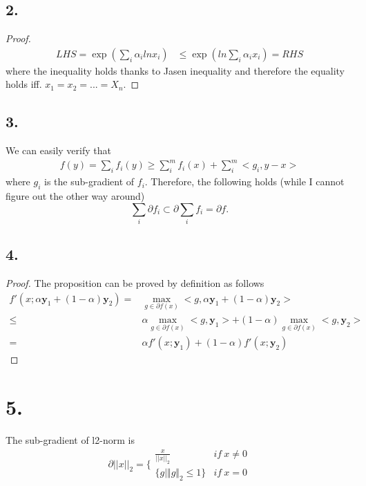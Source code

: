 \documentclass{article}
\begin{document}
\subsection{2.}
\begin{proof}
\begin{align*}
LHS = \exp(\sum_i \alpha_i ln x_i) &\leq \exp( ln \sum_i \alpha_i x_i) = RHS
\end{align*}
where the inequality holds thanks to Jasen inequality and therefore the equality holds iff. $x_1 = x_2= ...= X_n$.
\end{proof}
\subsection{3.}
We can easily verify that
\begin{align*}
f(y) = \sum_i f_i(y) \ge \sum_i^m f_i(x) + \sum_i^m<g_i, y-x> 
\end{align*}
where $g_i$ is the sub-gradient of $f_i$. Therefore, the following holds (while I cannot figure out the other way around)
$$
\sum_i \partial f_i \subset \partial \sum_i f_i = \partial f.
$$

\subsection{4.}
\begin{proof}
The proposition can be proved by definition as follows
\begin{align*}
f'(x; \alpha \mathbf{y}_1 + (1 - \alpha) \mathbf{y}_2) = & \max_{g \in \partial f(x)} <g, \alpha \mathbf{y}_1 + (1 - \alpha) \mathbf{y}_2> \\
\leq & \alpha \max_{g \in \partial f(x)} <g, \mathbf{y}_1> + (1 - \alpha)\max_{g \in \partial f(x)} <g, \mathbf{y}_2> \\
= & \alpha f'(x;\mathbf{y}_1) + (1 - \alpha) f'(x;\mathbf{y}_2)
\end{align*}
\end{proof}

\section{5.}
The sub-gradient of l2-norm is 
\begin{equation}
\partial ||x||_2 = \lbrace 
\begin{array}{cc}
\frac{x}{||x||_2} & if \ x \neq 0 \\
\{g | \Vert g \Vert_2 \leq 1\} & if \ x = 0
\end{array}
\end{equation}
\end{document}
